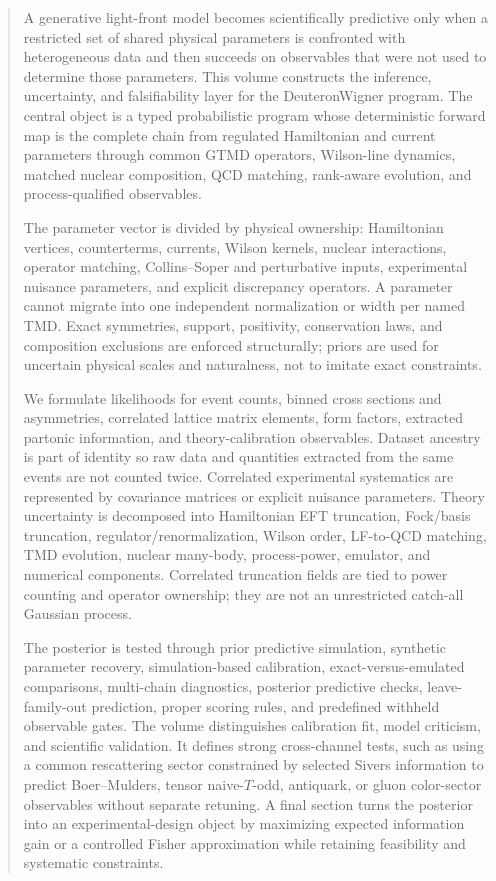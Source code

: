 \documentclass[11pt]{article}
\begin{document}
\begin{abstract}
A generative light-front model becomes scientifically predictive only when a
restricted set of shared physical parameters is confronted with heterogeneous
data and then succeeds on observables that were not used to determine those
parameters.  This volume constructs the inference, uncertainty, and
falsifiability layer for the DeuteronWigner program.  The central object is a
typed probabilistic program whose deterministic forward map is the complete
chain from regulated Hamiltonian and current parameters through common GTMD
operators, Wilson-line dynamics, matched nuclear composition, QCD matching,
rank-aware evolution, and process-qualified observables.

The parameter vector is divided by physical ownership: Hamiltonian vertices,
counterterms, currents, Wilson kernels, nuclear interactions, operator
matching, Collins--Soper and perturbative inputs, experimental nuisance
parameters, and explicit discrepancy operators.  A parameter cannot migrate
into one independent normalization or width per named TMD.  Exact symmetries,
support, positivity, conservation laws, and composition exclusions are
enforced structurally; priors are used for uncertain physical scales and
naturalness, not to imitate exact constraints.

We formulate likelihoods for event counts, binned cross sections and
asymmetries, correlated lattice matrix elements, form factors, extracted
partonic information, and theory-calibration observables.  Dataset ancestry is
part of identity so raw data and quantities extracted from the same events are
not counted twice.  Correlated experimental systematics are represented by
covariance matrices or explicit nuisance parameters.  Theory uncertainty is
decomposed into Hamiltonian EFT truncation, Fock/basis truncation,
regulator/renormalization, Wilson order, LF-to-QCD matching, TMD evolution,
nuclear many-body, process-power, emulator, and numerical components.
Correlated truncation fields are tied to power counting and operator ownership;
they are not an unrestricted catch-all Gaussian process.

The posterior is tested through prior predictive simulation, synthetic
parameter recovery, simulation-based calibration, exact-versus-emulated
comparisons, multi-chain diagnostics, posterior predictive checks,
leave-family-out prediction, proper scoring rules, and predefined withheld
observable gates.  The volume distinguishes calibration fit, model criticism,
and scientific validation.  It defines strong cross-channel tests, such as
using a common rescattering sector constrained by selected Sivers information
to predict Boer--Mulders, tensor naive-\(T\)-odd, antiquark, or gluon
color-sector observables without separate retuning.  A final section turns the
posterior into an experimental-design object by maximizing expected information
gain or a controlled Fisher approximation while retaining feasibility and
systematic constraints.


\end{abstract}
\end{document}
